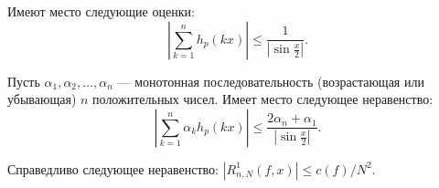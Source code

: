 \begin{lemma} \label{hx_sum_estimate}
	Имеют место следующие оценки:
	\begin{equation*}
	\left|\sum_{k=1}^{n}h_{p}(kx)\right|\leq\frac{1}{\left|\sin\frac{x}{2}\right|}.
	\end{equation*}
\end{lemma}

\begin{lemma}\label{akhkx_estimate}
	Пусть $\alpha_1,\alpha_2, \ldots, \alpha_n$ --- монотонная последовательность (возрастающая или убывающая) $n$ положительных чисел. Имеет место следующее неравенство:
	$$
	\left|\sum_{k=1}^{n} \alpha_{k} h_p(kx)\right| \leq \frac{2\alpha_n + \alpha_1}{\left|\sin \frac{x}{2}\right|}.
	$$
\end{lemma}


\begin{lemma}
	Справедливо следующее неравенство:
	$
	\left|R_{n,N}^{1}(f,x)\right|\leq{c(f)}/{N^{2}}.
	$
\end{lemma}



